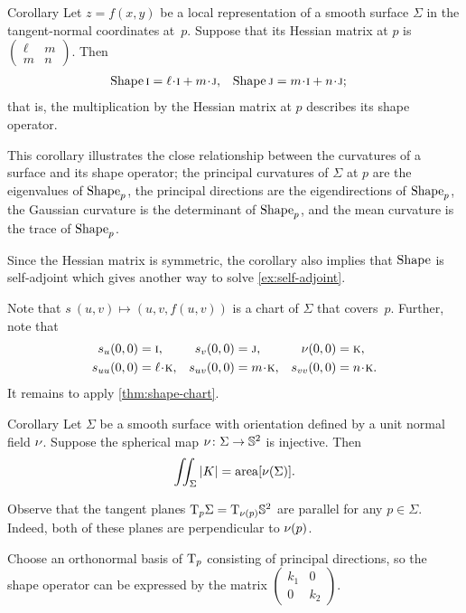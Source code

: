 \begin{thm}{Corollary}\label{cor:Shape(ij)}
Let $z=f(x,y)$ be a local representation of a smooth surface $\Sigma$ in the tangent-normal coordinates at~$p$.
Suppose that its Hessian matrix at $p$ is $(\begin{smallmatrix}
\ell&m\\ m&n
\end{smallmatrix})$.
Then 
\begin{align*}
\Shape\vec i&=\ell\cdot \vec i+m\cdot \vec j,
&
\Shape\vec j&=m\cdot \vec i+n\cdot\vec j;
\end{align*}
that is, the multiplication by the Hessian matrix at $p$ describes its shape operator.
\end{thm}


This corollary illustrates the close relationship between the curvatures of a surface and its shape operator; the principal curvatures of $\Sigma$ at $p$ are the eigenvalues of $\mathop{\rm Shape}\nolimits_p$, the principal directions are the eigendirections of $\mathop{\rm Shape}\nolimits_p$, the Gaussian curvature is the determinant of $\mathop{\rm Shape}\nolimits_p$, and the mean curvature is the trace of $\mathop{\rm Shape}\nolimits_p$.


Since the Hessian matrix is symmetric, the corollary also implies that $\mathop{\rm Shape}\nolimits$ is self-adjoint which gives another way to solve \ref{ex:self-adjoint}.

Note that $s\:(u,v)\mapsto (u,v,f(u,v))$ is a chart of $\Sigma$ that covers~$p$.
Further, note that 
\begin{align*}
s_u(0,0)&=\vec i,
&
s_v(0,0)&=\vec j,
&
\Norm(0,0)&=\vec k,
\\
s_{uu}(0,0)&=\ell\cdot \vec k,
&
s_{uv}(0,0)&=m\cdot \vec k,
&
s_{vv}(0,0)&=n\cdot \vec k.
\end{align*}
It remains to apply \ref{thm:shape-chart}.
\qeds

\begin{thm}{Corollary}\label{cor:intK}
Let $\Sigma$ be a smooth surface with orientation defined by a unit normal field $\nu$.
Suppose the spherical map $\nu\colon\Sigma\to\mathbb{S}^2$ is injective.
Then 
\[\iint_\Sigma|K|=\mathop{\rm area}\nolimits[\nu(\Sigma)].\]
\end{thm}

Observe that the tangent planes $\mathrm{T}_p\Sigma=\mathrm{T}_{\nu(p)}\mathbb{S}^2$ are parallel for any $p\in\Sigma$.
Indeed, both of these planes are perpendicular to $\nu(p)$. 


Choose an orthonormal basis of $\mathrm{T}_p$ consisting of principal directions,
so the shape operator can be expressed by the matrix 
$(\begin{smallmatrix}
 k_1
 &0
 \\
 0
 &k_2
 \end{smallmatrix})$.

